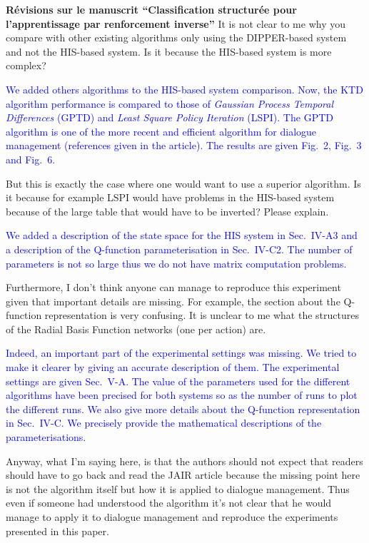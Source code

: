 \documentclass[11pt, a4paper]{letter}
\begin{document}
\begin{letter}{\large \textbf{Révisions sur le manuscrit ``Classification structurée pour l'apprentissage par renforcement inverse''}}
It is not clear to me why you compare with other existing
 algorithms only using the DIPPER-based system and not the HIS-based system.
 Is it because the HIS-based system is more complex?

\textcolor{blue}{We added others algorithms to the HIS-based system
comparison. Now, the KTD algorithm performance is compared to those
of \textit{Gaussian Process Temporal Differences} (GPTD) and
\textit{Least Square Policy Iteration} (LSPI). The GPTD algorithm is
one of the more recent and efficient algorithm for dialogue
management (references given in the article). The results are given
Fig.~2, Fig.~3 and Fig.~6.}

But this is exactly the case where one would want to use a superior algorithm. Is it because
 for example LSPI would have problems in the HIS-based system because of the
 large table that would have to be inverted? Please explain.

\textcolor{blue}{We added a description of the state space for the
HIS system in Sec.~IV-A3 and a description of the Q-function
parameterisation in Sec.~IV-C2. The number of parameters is not so
large thus we do not have matrix computation problems.}


Furthermore, I don't think anyone can manage to reproduce this experiment given that
 important details are missing. For example, the section about the
 Q-function representation is very confusing. It is unclear to me what the
 structures of the Radial Basis Function networks (one per action) are.

\textcolor{blue}{Indeed, an important part of the experimental
settings was missing. We tried to make it clearer by giving an
accurate description of them. The experimental settings are given
Sec.~V-A. The value of the parameters used for the different
algorithms have been precised for both systems so as the number of
runs to plot the different runs. We also give more details about the
Q-function representation in Sec.~IV-C. We precisely provide the
mathematical descriptions of the parameterisations.}

 Anyway, what I'm saying here, is that the authors should not expect that
 readers should have to go back and read the JAIR article because the
 missing point here is not the algorithm itself but how it is applied to
 dialogue management. Thus even if someone had understood the algorithm it's
 not clear that he would manage to apply it to dialogue management and
 reproduce the experiments presented in this paper.


\end{letter}
\end{document}
